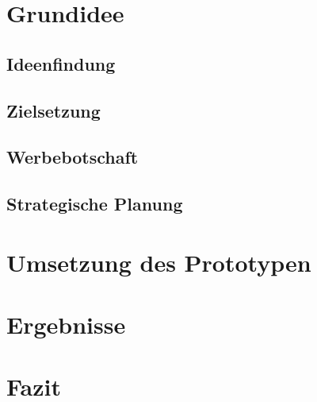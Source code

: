 







\tableofcontents


\clearpage
\section{Grundidee}
\subsection{Ideenfindung}
\subsection{Zielsetzung}
\subsection{Werbebotschaft}
\subsection{Strategische Planung}


\clearpage
\section{Umsetzung des Prototypen}




%





\clearpage
\section{Ergebnisse}


\clearpage

\clearpage

\clearpage
\section{Fazit}


